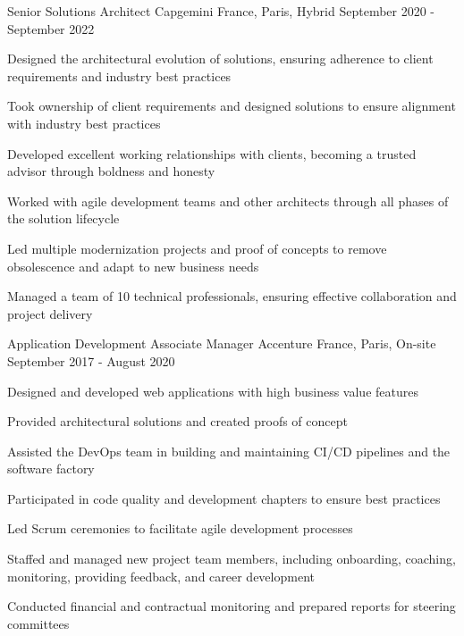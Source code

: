 \begin{cventries}
  \cventry
    {Senior Solutions Architect}
    {Capgemini}
    {France, Paris, Hybrid}
    {September 2020 - September 2022}
    {
      \begin{cvitems}
        \item {Designed the architectural evolution of solutions, ensuring adherence to client requirements and industry best practices}
        \item {Took ownership of client requirements and designed solutions to ensure alignment with industry best practices}
        \item {Developed excellent working relationships with clients, becoming a trusted advisor through boldness and honesty}
        \item {Worked with agile development teams and other architects through all phases of the solution lifecycle}
        \item {Led multiple modernization projects and proof of concepts to remove obsolescence and adapt to new business needs}
        \item {Managed a team of 10 technical professionals, ensuring effective collaboration and project delivery}
      \end{cvitems}
    }

  \cventry
    {Application Development Associate Manager}
    {Accenture}
    {France, Paris, On-site}
    {September 2017 - August 2020}
    {
      \begin{cvitems}
        \item {Designed and developed web applications with high business value features}
        \item {Provided architectural solutions and created proofs of concept}
        \item {Assisted the DevOps team in building and maintaining CI/CD pipelines and the software factory}
        \item {Participated in code quality and development chapters to ensure best practices}
        \item {Led Scrum ceremonies to facilitate agile development processes}
        \item {Staffed and managed new project team members, including onboarding, coaching, monitoring, providing feedback, and career development}
        \item {Conducted financial and contractual monitoring and prepared reports for steering committees}
      \end{cvitems}
    }


\end{cventries}
